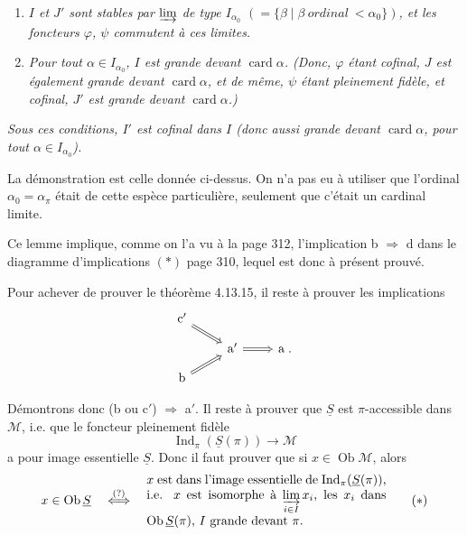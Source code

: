 \documentclass[11pt]{article}
\newcommand{\printedpage}[1]{\marginpar{\footnotesize p.~#1}}
\newcommand{\msp}[1]{\marginpar{\footnotesize [#1]}}
\DeclareMathOperator{\card}{card}
\DeclareMathOperator{\Ob}{Ob}
\DeclareMathOperator{\Ind}{Ind}
\begin{document}
\begin{enumerate}[label={}]
\item[\textit{2)}] \textit{$I$ et $J'$ sont stables par $\varinjlim$ de type $I_{\alpha_0}$ $(= \{\beta \mid \beta \ \textit{ordinal}\ < \alpha_0\})$, et les foncteurs $\varphi$, $\psi$ commutent à ces limites.}
\item[\textit{3)}] \textit{Pour tout $\alpha \in I_{\alpha_0}$, $I$ est grande devant $\card\alpha$. (Donc, $\varphi$ étant cofinal, $J$ est également grande devant $\card\alpha$, et de même, $\psi$ étant pleinement fidèle, et cofinal, $J'$ est grande devant $\card\alpha$.)}
\end{enumerate}

\textit{Sous ces conditions, $I'$ est cofinal dans $I$ (donc aussi grande devant $\card\alpha$, pour tout $\alpha \in I_{\alpha_0}$).}

La démonstration est celle donnée ci-dessus. On n'a pas eu à utiliser que l'ordinal $\alpha_0 = \alpha_\pi$ était de cette espèce particulière, seulement que c'était un cardinal limite.

\printedpage{125}

\msp{page 331}

Ce lemme implique, comme on l'a vu à la page 312, l'implication b $\Longrightarrow$ d dans le diagramme d'implications $(*)$ page 310, lequel est donc à présent prouvé.

Pour achever de prouver le théorème 4.13.15, il reste à prouver les implications
\[
\begin{tikzcd}[row sep=small]
\mathrm{c}' \arrow[dr, Rightarrow] & & \\
& \mathrm{a}' \arrow[r, Rightarrow] & \mathrm{a} \; . \\
\mathrm{b} \arrow[ur, Rightarrow] & &
\end{tikzcd}
\]

Démontrons donc (b ou c$'$) $\Longrightarrow$ a$'$. Il reste à prouver que $\underline{S}$ est $\pi$-accessible dans $\mathcal{M}$, i.e. que le foncteur pleinement fidèle
\[
\Ind_\pi(\underline{S}(\pi)) \longrightarrow \mathcal{M} \tag*{$(*)$}
\]
a pour image essentielle $\underline{S}$. Donc il faut prouver que si $x \in \Ob\mathcal{M}$, alors
\[
x \in \Ob\underline{S} \quad \overset{(?)}{\Longleftrightarrow} \quad
\begin{minipage}[c]{0.55\textwidth}
$x$ est dans l'image essentielle de $\Ind_\pi(\underline{S}(\pi))$, i.e. $x$ est isomorphe à $\varinjlim\limits_{i\in I} x_i$, les $x_i$ dans $\Ob\underline{S}(\pi)$, $I$ grande devant $\pi$.
\end{minipage}
\tag*{$(*)$}
\]
\end{document}
